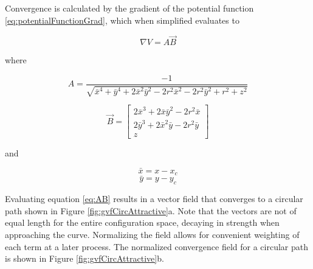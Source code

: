\documentclass[numbered,pdftex]{ohio-etd}
\begin{document}
Convergence is calculated by the gradient of the potential function \ref{eq:potentialFunctionGrad}, which when simplified evaluates to

\begin{equation}
\nabla V = A\overrightarrow{B}
\label{eq:AB}
\end{equation}

\noindent
where


\begin{equation}
A = \dfrac{-1}{\sqrt{\bar{x}^4+\bar{y}^4+2\bar{x}^2\bar{y}^2-2r^2\bar{x}^2-2r^2\bar{y}^2+r^2+z^2}}
\end{equation}

\begin{equation}
\overrightarrow{B} = \begin{bmatrix} 2\bar{x}^3+2\bar{x}\bar{y}^2-2r^2\bar{x} \\ 2\bar{y}^3+2\bar{x}^2\bar{y}-2r^2\bar{y} \\z \end{bmatrix}
\end{equation}

\noindent
and


\begin{equation}
\bar{x} = x - x_c
\end{equation}
\begin{equation}
\bar{y} = y - y_c
\end{equation}


Evaluating equation \ref{eq:AB} results in a vector field that converges to a circular path shown in Figure \ref{fig:gvfCircAttractive}a. Note that the vectors are not of equal length for the entire configuration space, decaying in strength when approaching the curve. Normalizing the field allows for convenient weighting of each term at a later process. The normalized convergence field for a circular path is shown in Figure \ref{fig:gvfCircAttractive}b. 
\end{document}
